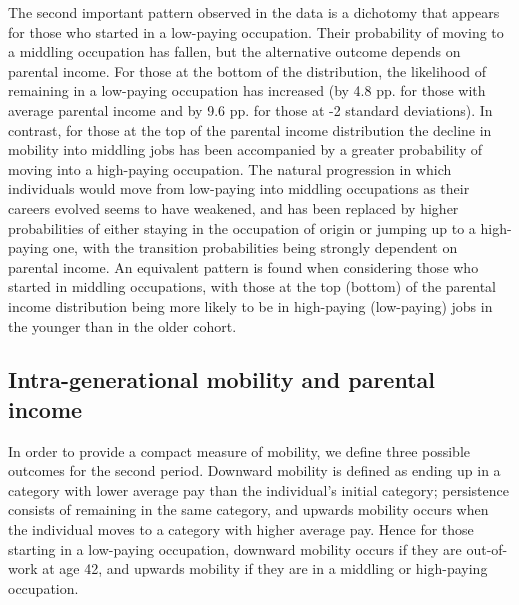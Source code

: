 The second important pattern observed in the data is a dichotomy that appears for those who started in a low-paying occupation. Their probability of moving to a middling occupation has fallen, but the alternative outcome depends on parental income. For those at the bottom of the distribution, the likelihood of remaining in a low-paying occupation has increased (by  4.8 pp. for those with average parental income and by 9.6 pp. for those at -2 standard deviations). In contrast, for those at the top of the parental income distribution the decline in mobility into middling jobs has been accompanied by a greater probability of moving into a high-paying occupation. The natural progression in which individuals would move from low-paying into middling occupations as their careers evolved seems to have weakened, and has been replaced by higher probabilities of either staying in the occupation of origin or jumping up to a high-paying one, with the transition probabilities being strongly dependent on parental income. An equivalent pattern is found when considering those who started in middling occupations, with those at the top (bottom) of the parental income distribution being more likely to be in high-paying (low-paying) jobs in the younger than in the older cohort. 

\subsection{Intra-generational mobility and parental income}

In order to provide a compact measure of mobility, we define three possible outcomes for the second period. Downward mobility is defined as ending up in a category with lower average pay than the individual's initial category; persistence consists of remaining in the same category, and upwards mobility occurs when the individual moves to a category with higher average pay. Hence for those starting in a low-paying occupation, downward mobility occurs if they are out-of-work at age 42, and upwards mobility if they are in a middling or high-paying occupation. 

